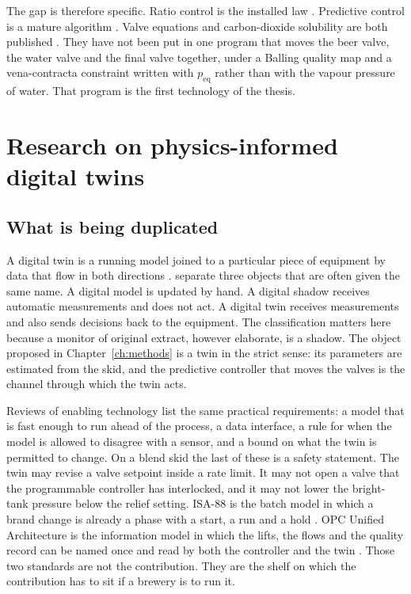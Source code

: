 The gap is therefore specific. Ratio control is the installed law \citep{centec2024,corosysweb,shinskey1996}. Predictive control is a mature algorithm \citep{qin2003,rawlings2017}. Valve equations and carbon-dioxide solubility are both published \citep{iec60534,speers2013}. They have not been put in one program that moves the beer valve, the water valve and the final valve together, under a Balling quality map and a vena-contracta constraint written with $p_{\mathrm{eq}}$ rather than with the vapour pressure of water. That program is the first technology of the thesis.

\section{Research on physics-informed digital twins}
\label{sec:tech2lit}

\subsection{What is being duplicated}

A digital twin is a running model joined to a particular piece of equipment by data that flow in both directions \citep{tao2019,fuller2020,jones2020}. \citet{kritzinger2018} separate three objects that are often given the same name. A digital model is updated by hand. A digital shadow receives automatic measurements and does not act. A digital twin receives measurements and also sends decisions back to the equipment. The classification matters here because a monitor of original extract, however elaborate, is a shadow. The object proposed in Chapter~\ref{ch:methods} is a twin in the strict sense: its parameters are estimated from the skid, and the predictive controller that moves the valves is the channel through which the twin acts.

Reviews of enabling technology \citep{fuller2020,jones2020,tao2019} list the same practical requirements: a model that is fast enough to run ahead of the process, a data interface, a rule for when the model is allowed to disagree with a sensor, and a bound on what the twin is permitted to change. On a blend skid the last of these is a safety statement. The twin may revise a valve setpoint inside a rate limit. It may not open a valve that the programmable controller has interlocked, and it may not lower the bright-tank pressure below the relief setting. ISA-88 is the batch model in which a brand change is already a phase with a start, a run and a hold \citep{isa88}. OPC Unified Architecture is the information model in which the lifts, the flows and the quality record can be named once and read by both the controller and the twin \citep{iec62541}. Those two standards are not the contribution. They are the shelf on which the contribution has to sit if a brewery is to run it.

